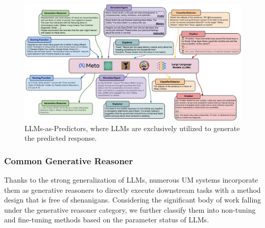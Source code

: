 \documentclass[11pt]{article}
\begin{document}
\begin{figure}[t]
    \centering
    \includegraphics[width=0.98\linewidth]{submissions/Meng2023/figs/LLM-UM Predictors.pdf}
    \caption{LLMs-as-Predictors, where LLMs are exclusively utilized to generate the predicted response.}
    \label{fig:enter-label}
\end{figure}



\subsubsection{Common Generative Reasoner}
Thanks to the strong generalization of LLMs, numerous UM systems incorporate them as generative reasoners to directly execute downstream tasks with a method design that is free of shenanigans. Considering the significant body of work falling under the generative reasoner category, we further classify them into non-tuning and fine-tuning methods based on the parameter status of LLMs. 
\end{document}
